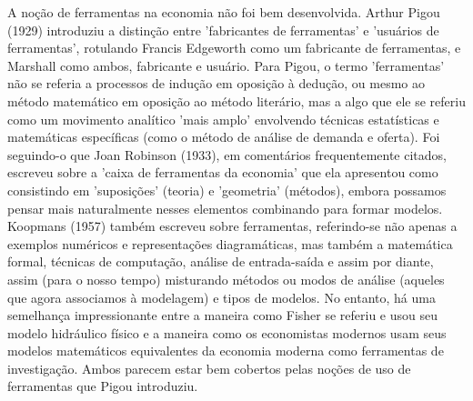 \documentclass[a4paper,12pt]{article}[abntex2]
\begin{document}
A noção de ferramentas na economia não foi bem desenvolvida. Arthur Pigou (1929) introduziu a distinção entre 'fabricantes de ferramentas' e 'usuários de ferramentas', rotulando Francis Edgeworth como um fabricante de ferramentas, e Marshall como ambos, fabricante e usuário. Para Pigou, o termo 'ferramentas' não se referia a processos de indução em oposição à dedução, ou mesmo ao método matemático em oposição ao método literário, mas a algo que ele se referiu como um movimento analítico 'mais amplo' envolvendo técnicas estatísticas e matemáticas específicas (como o método de análise de demanda e oferta). Foi seguindo-o que Joan Robinson (1933), em comentários frequentemente citados, escreveu sobre a 'caixa de ferramentas da economia' que ela apresentou como consistindo em 'suposições' (teoria) e 'geometria' (métodos), embora possamos pensar mais naturalmente nesses elementos combinando para formar modelos. Koopmans (1957) também escreveu sobre ferramentas, referindo-se não apenas a exemplos numéricos e representações diagramáticas, mas também a matemática formal, técnicas de computação, análise de entrada-saída e assim por diante, assim (para o nosso tempo) misturando métodos ou modos de análise (aqueles que agora associamos à modelagem) e tipos de modelos. No entanto, há uma semelhança impressionante entre a maneira como Fisher se referiu e usou seu modelo hidráulico físico e a maneira como os economistas modernos usam seus modelos matemáticos equivalentes da economia moderna como ferramentas de investigação. Ambos parecem estar bem cobertos pelas noções de uso de ferramentas que Pigou introduziu.
\end{document}
